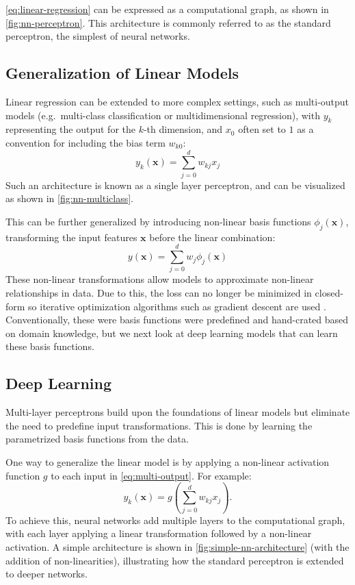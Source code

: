 \cref{eq:linear-regression} can be expressed as a computational graph, as shown in \cref{fig:nn-perceptron}. This architecture is commonly referred to as the standard perceptron, the simplest of neural networks.

\subsection{Generalization of Linear Models}
Linear regression can be extended to more complex settings, such as multi-output models (e.g.\ multi-class classification or multidimensional regression), with $y_k$ representing the output for the $k$-th dimension, and $x_0$ often set to $1$ as a convention for including the bias term $w_{k0}$:
\begin{equation}\label{eq:multi-output}
    y_k(\mathbf{x}) = \sum_{j=0}^{d} w_{kj} x_j
\end{equation}
Such an architecture is known as a single layer perceptron, and can be visualized as shown in \cref{fig:nn-multiclass}.

This can be further generalized by introducing non-linear basis functions $\phi_j(\mathbf{x})$, transforming the input features $\mathbf{x}$ before the linear combination:
\begin{equation}
    y(\mathbf{x}) = \sum_{j=0}^{d} w_j \phi_j(\mathbf{x})
\end{equation}
These non-linear transformations allow models to approximate non-linear relationships in data. Due to this, the loss can no longer be minimized in closed-form so iterative optimization algorithms such as gradient descent are used \cite{bishopPatternRecognitionMachine2006}.
Conventionally, these were basis functions were predefined and hand-crated based on domain knowledge, but we next look at deep learning models that can learn these basis functions.

\subsection{Deep Learning}
Multi-layer perceptrons build upon the foundations of linear models but eliminate the need to predefine input transformations. This is done by learning the parametrized basis functions from the data. 

One way to generalize the linear model is by applying a non-linear activation function $g$ to each input in \cref{eq:multi-output}. For example:
\begin{equation}
y_k(\mathbf{x}) = g\left(\sum_{j=0}^{d} w_{kj} x_j \right).
\end{equation}
To achieve this, neural networks add multiple layers to the computational graph, with each layer applying a linear transformation followed by a non-linear activation. A simple architecture is shown in \cref{fig:simple-nn-architecture} (with the addition of non-linearities), illustrating how the standard perceptron is extended to deeper networks.

